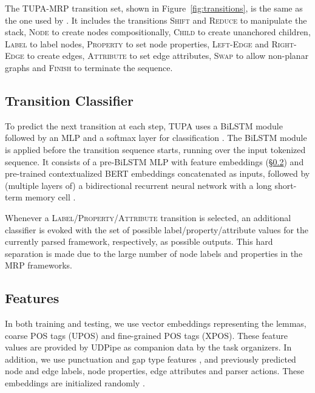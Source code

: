 \documentclass[11pt,a4paper]{article}
\begin{document}
The TUPA-MRP transition set, shown in Figure~\ref{fig:transitions}, is the same as the one
used by .
It includes the transitions \textsc{Shift} and \textsc{Reduce} to manipulate the stack, \textsc{Node} to create nodes compositionally, \textsc{Child} to create unanchored children, \textsc{Label} to label nodes, \textsc{Property} to set node properties, \textsc{Left-Edge} and \textsc{Right-Edge} to create edges, \textsc{Attribute} to set edge attributes, \textsc{Swap} to allow non-planar graphs and \textsc{Finish} to terminate the sequence.

\subsection{Transition Classifier}\label{sec:tupa-classifier}

To predict the next transition at each step, TUPA uses a BiLSTM module followed by an MLP and a softmax layer for classification \cite{kiperwasser2016simple}. The BiLSTM module is applied before the transition sequence starts, running over the input tokenized sequence. It consists of a pre-BiLSTM MLP with feature embeddings (\S\ref{sec:tupa-features}) and pre-trained contextualized BERT \cite{devlin-etal-2019-bert} embeddings concatenated as inputs,
followed by (multiple layers of) a bidirectional recurrent neural network \cite{schuster1997bidirectional,graves2008supervised} with a long short-term memory cell \cite{hochreiter1997long}.

Whenever a \textsc{Label}/\textsc{Property}/\textsc{Attribute} transition is selected, an additional classifier is evoked with the set of possible label/property/attribute values for the currently parsed framework, respectively, as possible outputs. This hard separation is made due to the large number of node labels and properties in the MRP frameworks.

\subsection{Features}\label{sec:tupa-features}

In both training and testing, we use vector embeddings representing the lemmas, coarse POS tags (UPOS) and fine-grained POS tags (XPOS). These feature values are provided by UDPipe as companion data by the task organizers. In addition, we use punctuation and gap type features \cite{maier-lichte:2016:DiscoNLP}, and previously predicted node and edge labels, node properties, edge attributes and parser actions. These embeddings are initialized randomly \cite{glorot2010understanding}.
\end{document}
